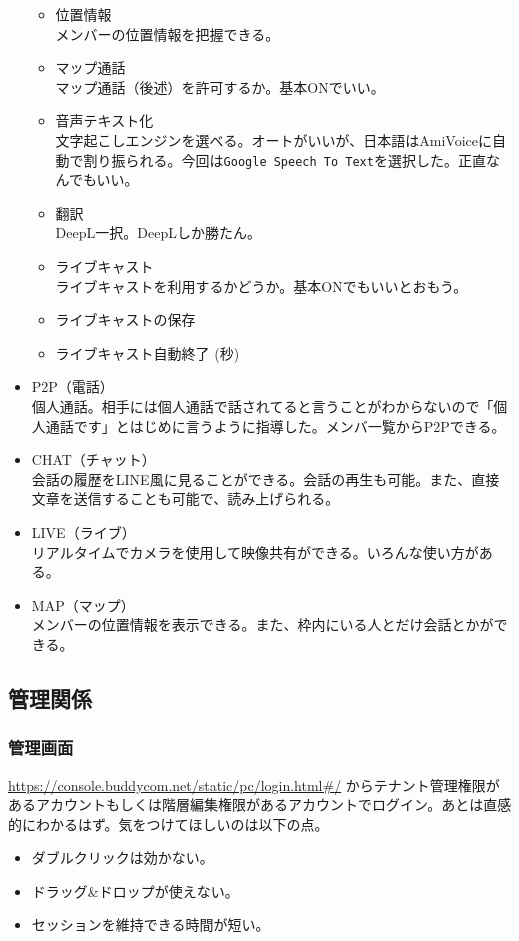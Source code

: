 \documentclass[dvipdfmx,jb5]{jarticle}
\begin{document}
\begin{itemize}
\begin{itemize}
\item 位置情報\\
メンバーの位置情報を把握できる。
\item マップ通話\\
マップ通話（後述）を許可するか。基本ONでいい。
\item 音声テキスト化\\
文字起こしエンジンを選べる。オートがいいが、日本語はAmiVoiceに自動で割り振られる。今回は\verb|Google Speech To Text|を選択した。正直なんでもいい。
\item 翻訳\\
DeepL一択。DeepLしか勝たん。
\item ライブキャスト\\
ライブキャストを利用するかどうか。基本ONでもいいとおもう。
\item ライブキャストの保存
\item ライブキャスト自動終了 (秒)
\end{itemize}
\item P2P（電話）\\
個人通話。相手には個人通話で話されてると言うことがわからないので「個人通話です」とはじめに言うように指導した。メンバ一覧からP2Pできる。
\item CHAT（チャット）\\
会話の履歴をLINE風に見ることができる。会話の再生も可能。また、直接文章を送信することも可能で、読み上げられる。
\item LIVE（ライブ）\\
リアルタイムでカメラを使用して映像共有ができる。いろんな使い方がある。
\item MAP（マップ）\\
メンバーの位置情報を表示できる。また、枠内にいる人とだけ会話とかができる。
\end{itemize}

\subsection{管理関係}
\subsubsection{管理画面}
\url{https://console.buddycom.net/static/pc/login.html#/} からテナント管理権限があるアカウントもしくは階層編集権限があるアカウントでログイン。あとは直感的にわかるはず。気をつけてほしいのは以下の点。

\begin{itemize}
\item ダブルクリックは効かない。
\item ドラッグ\&ドロップが使えない。
\item セッションを維持できる時間が短い。
\end{itemize}
\end{document}
